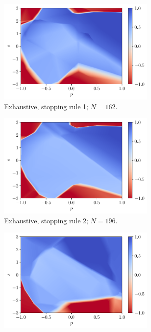 \documentclass[a4paper, 12pt]{article}
\begin{document}
    \begin{figure}[H]
        \centering
        \begin{subfigure}{0.49\textwidth}
            \centering
            \includegraphics[width=0.85\textwidth]{resources/pdf/4_exhaustive_1_MLP_q_+4.pdf}
            \caption{Exhaustive, stopping rule 1; $N = 162$.}
            \vspace{0.5em}
        \end{subfigure}
        \hfill
        \begin{subfigure}{0.49\textwidth}
            \centering
            \includegraphics[width=0.85\textwidth]{resources/pdf/4_exhaustive_2_MLP_q_+4.pdf}
            \caption{Exhaustive, stopping rule 2; $N = 196$.}
            \vspace{0.5em}
        \end{subfigure}
        \begin{subfigure}{0.49\textwidth}
            \centering\includegraphics[width=0.85\textwidth]{resources/pdf/4_montecarlo_1_MLP_q_+4.pdf}

\end{subfigure}
\end{figure}
\end{document}
